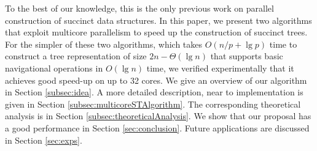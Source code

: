 To the best of our knowledge, this is the only previous work on
parallel construction of succinct data structures. In this paper, we
present two algorithms that exploit multicore parallelism to speed up
the construction of succinct trees.  For the simpler of these two
algorithms, which takes $O(n/p + \lg p)$ time to construct a tree
representation of size $2n - \Theta(\lg n)$ that supports basic
navigational operations in $O(\lg n)$ time, we verified experimentally
that it achieves good speed-up on up to 32 cores.    We give an
overview of our algorithm in Section \ref{subsec:idea}. A more
detailed description, near to implementation is given in Section
\ref{subsec:multicoreSTAlgorithm}.  The corresponding theoretical
analysis is in Section \ref{subsec:theoreticalAnalysis}.  We show that
our proposal has a good performance in Section
\ref{sec:conclusion}. Future applications are discussed in Section
\ref{sec:exps}.  
